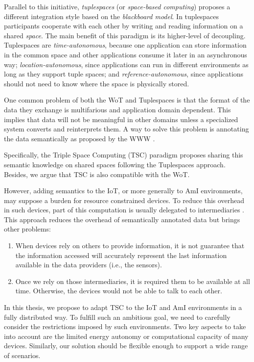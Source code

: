 Parallel to this initiative, \emph{tuplespaces} (or \emph{space-based computing}) \cite{gelernter_generative_1985} proposes a different integration style based on the \emph{blackboard model}.
In tuplespaces participants cooperate with each other by writing and reading information on a shared \emph{space}.
The main benefit of this paradigm is its higher-level of decoupling.
Tuplespaces are
\emph{time-autonomous}, because one application can store information in the common space and other applications consume it later in an asynchronous way;
\emph{location-autonomous}, since applications can run in different environments as long as they support tuple spaces;
and \emph{reference-autonomous}, since applications should not need to know where the space is physically stored.

\medskip

One common problem of both the WoT and Tuplespaces is that the format of the data they exchange is multifarious and application domain dependent.
This implies that data will not be meaningful in other domains unless a specialized system converts and reinterprets them.
A way to solve this problem is annotating the data semantically as proposed by the WWW \cite{berners-lee_semantic_2001}.

Specifically, the Triple Space Computing (TSC) paradigm \cite{fensel_triple-space_2004} proposes sharing this semantic knowledge on shared spaces following the Tuplespaces approach.
Besides, we argue that TSC is also compatible with the WoT.

However, adding semantics to the IoT, or more generally to AmI environments, may suppose a burden for resource constrained devices.
To reduce this overhead in such devices, part of this computation is usually delegated to intermediaries \cite{honkola_smart-m3_2010}. %
This approach reduces the overhead of semantically annotated data but brings other problems:
\begin{enumerate}
 \item When devices rely on others to provide information, it is not guarantee that the information accessed will accurately represent the last information available in the data providers (i.e., the sensors).
 \item Once we rely on those intermediaries, it is required them to be available at all time. Otherwise, the devices would not be able to talk to each other.
\end{enumerate}

In this thesis, we propose to adapt TSC to the IoT and AmI environments in a fully distributed way.
To fulfill such an ambitious goal, we need to carefully consider the restrictions imposed by such environments.
Two key aspects to take into account are the limited energy autonomy or computational capacity of many devices.
Similarly, our solution should be flexible enough to support a wide range of scenarios.

